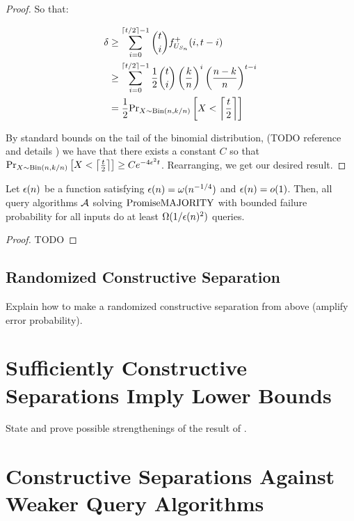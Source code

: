 \begin{proof}
So that:

\begin{align*}
\delta & \geq \sum_{i=0}^{\lceil t/2 \rceil-1} \binom{t}{i} f^+_{U_{S_n}}(i, t-i) \\
       & \geq \sum_{i=0}^{\lceil t/2 \rceil-1} \frac{1}{2} \binom{t}{i} \left(\frac{k}{n}\right)^i \left(\frac{n-k}{n} \right)^{t-i} \\
       & = \frac{1}{2} \text{Pr}_{X \sim \text{Bin}(n, k/n)}\left[X < \left\lceil \frac{t}{2} \right\rceil\right]
\end{align*}

By standard bounds on the tail of the binomial distribution,
(TODO reference and details )
we have that there exists a constant $C$ so that 
$\text{Pr}_{X \sim \text{Bin}(n, k/n)}\left[X < \left\lceil \frac{t}{2} \right\rceil\right] \geq C e^{-4\epsilon^2t}$.
Rearranging, we get our desired result. 

\end{proof}

\begin{corollary}
Let $\epsilon(n)$ be a function satisfying $\epsilon(n) = \omega(n^{-1/4})$ and $\epsilon(n) = o(1)$. Then, all query
algorithms $\mathcal{A}$ solving $\mathrm{PromiseMAJORITY}$ with bounded failure probability for all inputs do at least $\Omega(1/\epsilon(n)^2)$
queries. 
\end{corollary}
\begin{proof}
TODO 
\end{proof}

\subsection{Randomized Constructive Separation}

Explain how to make a randomized constructive separation from above (amplify error probability).



\section{Sufficiently Constructive Separations Imply Lower Bounds}

State and prove possible strengthenings of the result of \cite{ConstructiveSeparations}. 

\thmcsrefuterqa*

\section{Constructive Separations Against Weaker Query Algorithms}

